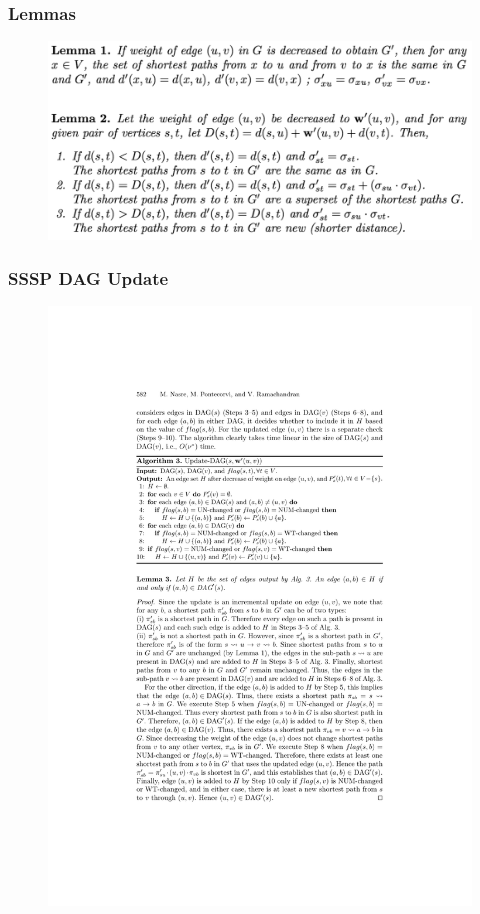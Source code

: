 \begin{frame}
  \frametitle{Lemmas}

  \begin{figure}[H]
    \centering
    \includegraphics[width=\textwidth]{imgs/npr14-lemmas}
  \end{figure}
  
\end{frame}

\begin{frame}
  \frametitle{SSSP DAG Update}

  \begin{figure}[H]
    \centering
    \includegraphics[width=\textwidth]{imgs/npr14-algo3}
  \end{figure}
  
\end{frame}

